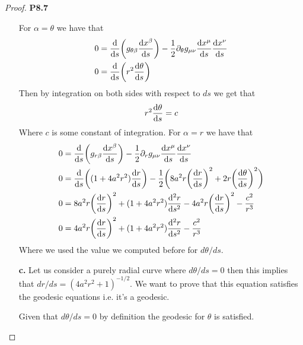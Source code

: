 \documentclass[11pt]{article}
\theoremstyle{definition}
\begin{document}
\begin{proof}{\textbf{P8.7}}
\begin{itemize}
        For $\alpha = \theta$ we have that
        \begin{align*}
            0 &= \derivative{}{s}\bigg(
            g_{\theta\beta}\derivative{x^\beta}{s}\bigg)
            - \frac{1}{2}\partial_\theta g_{\mu\nu}\derivative{x^\mu}{s}
            \derivative{x^\nu}{s}\\
            0 &= \derivative{}{s}\bigg(
            r^2\derivative{\theta}{s}\bigg)
        \end{align*}
        Then by integration on both sides with respect to $ds$ we get that
        \begin{align*}
            r^2\derivative{\theta}{s} = c
        \end{align*}
        Where $c$ is some constant of integration. For $\alpha = r$ we have
        that
        \begin{align*}
            0 &= \derivative{}{s}\bigg(
            g_{r\beta}\derivative{x^\beta}{s}\bigg)
            - \frac{1}{2}\partial_r g_{\mu\nu}\derivative{x^\mu}{s}
            \derivative{x^\nu}{s}\\
            0 &= \derivative{}{s}\bigg(
            (1 + 4a^2r^2)\derivative{r}{s}\bigg)
            - \frac{1}{2}\bigg(8a^2r\bigg(\derivative{r}{s}\bigg)^2
            + 2r\bigg(\derivative{\theta}{s}\bigg)^2\bigg)\\
            0 &= 8a^2r\bigg(\derivative{r}{s}\bigg)^2 +
            (1 + 4a^2r^2)\derivative[2]{r}{s}
            - 4a^2r\bigg(\derivative{r}{s}\bigg)^2
            - \frac{c^2}{r^3}\\
            0 &= 4a^2r\bigg(\derivative{r}{s}\bigg)^2 +
            (1 + 4a^2r^2)\derivative[2]{r}{s}
            - \frac{c^2}{r^3}
        \end{align*}
        Where we used the value we computed before for $d\theta/ds$.
\cleardoublepage
        \item [\textbf{c.}] Let us consider a purely radial curve where
        $d\theta/ds = 0$ then this implies that
        $dr/ds = (4a^2r^2 + 1)^{-1/2}$. We want to prove that this equation
        satisfies the geodesic equations i.e. it's a geodesic.
        
        Given that $d\theta/ds = 0$ by definition the geodesic for
        $\theta$ is satisfied.


\end{itemize}
\end{proof}
\end{document}
